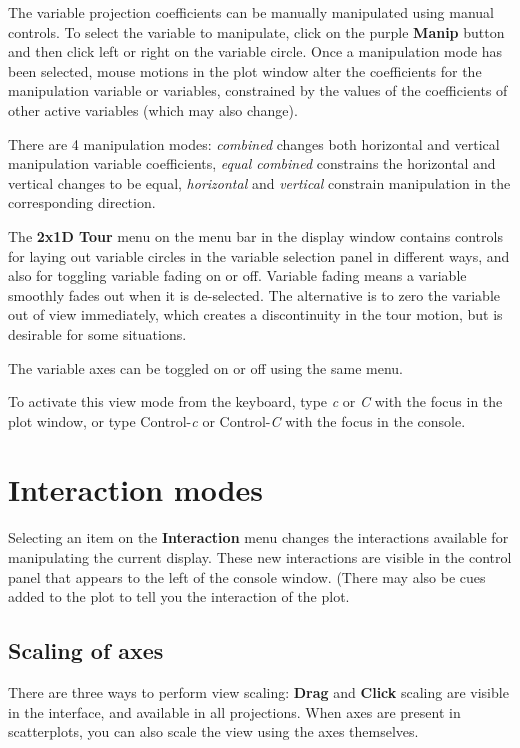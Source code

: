 \documentclass[11pt]{article}
\def\Widget#1{\textbf{#1}}
\begin{document}
The variable projection coefficients can be manually manipulated using
manual controls. To select the variable to manipulate, click on the purple
\Widget{Manip} button and then click left or right on the variable circle.
Once a manipulation mode has been selected, mouse motions in the plot
window alter the coefficients for the manipulation variable or variables,
constrained by the values of the coefficients of other active variables
(which may also change).

There are 4 manipulation modes: {\it combined} changes both horizontal
and vertical manipulation variable coefficients, {\it equal combined}
constrains the horizontal and vertical changes to be equal, {\it
horizontal} and {\it vertical} constrain manipulation in the corresponding
direction.

The \Widget{2x1D Tour} menu on the menu bar in the display window
contains controls for laying out variable circles in the variable
selection panel in different ways, and also for toggling variable
fading on or off. Variable fading means a variable smoothly fades out
when it is de-selected. The alternative is to zero the variable out of
view immediately, which creates a discontinuity in the tour motion,
but is desirable for some situations.

The variable axes can be toggled on or off using the same menu.

To activate this view mode from the keyboard, type {\em c} or {\em C}
with the focus in the plot window, or type Control-{\em c} or
Control-{\em C} with the focus in the console.

\section{Interaction modes}
\label{slbl:InteractionModes}

Selecting an item on the \Widget{Interaction} menu changes the
interactions available for manipulating the current display.  These
new interactions are visible in the control panel that appears to the
left of the console window.  (There may also be cues added to the plot
to tell you the interaction of the plot.

\subsection{Scaling of axes}
\label{slbl:Scaling}

There are three ways to perform view scaling: \Widget{Drag} and
\Widget{Click} scaling are visible in the interface, and available in
all projections.  When axes are present in scatterplots, you can also
scale the view using the axes themselves.
\end{document}
